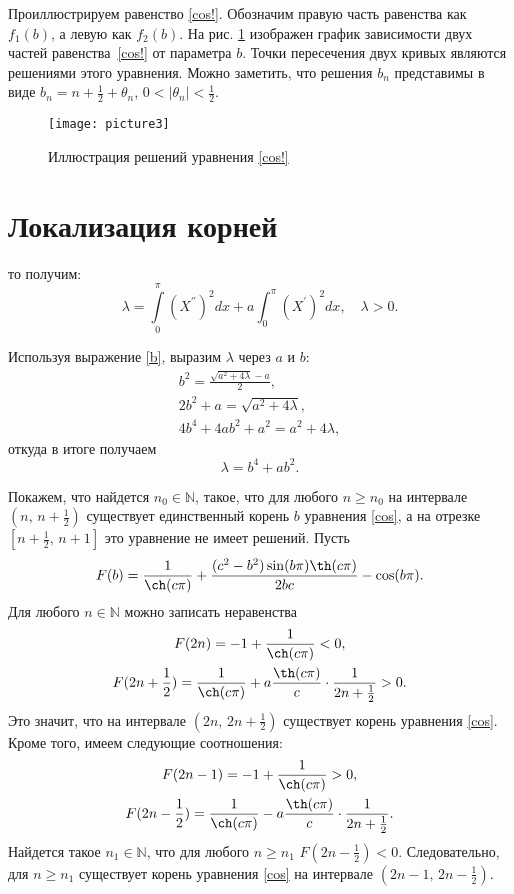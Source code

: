 \documentclass[12pt, a4paper]{article}
\begin{document}
Проиллюстрируем равенство \eqref{cos!}. Обозначим правую часть равенства как $f_1(b)$, а левую как $f_2(b)$. На рис. \ref{fig1} изображен график зависимости двух частей равенства~\eqref{cos!} от параметра $b$. Точки пересечения двух кривых являются решениями этого уравне\-ния. Можно заметить, что решения ${b_n}$ представимы в виде 
$b_n=n+\frac12+\theta_n$, $0<|\theta_n|<\frac12$.

\begin{figure}[h!]
	\begin{center}
		\texttt{[image: picture3]}
		\caption{Иллюстрация решений уравнения \eqref{cos!}}
		\label{fig1}
	\end{center}
\end{figure}

\section{Локализация корней}

 то получим:
\[
\lambda = \int\limits_0^\pi(X^{''})^2dx + a\int_0^\pi(X^{'})^2dx, \quad \lambda>0.
\]

Используя выражение \eqref{b}, выразим $\lambda$ через $a$ и $b$:
\begin{gather*}
b^2 = \frac{\sqrt{a^2+4\lambda}-a}{2}, \\
2b^2 + a = \sqrt{a^2+4\lambda}, \\
4b^4 +4ab^2 + a^2 = a^2 +4\lambda,
\end{gather*}
откуда в итоге получаем 
\begin{equation}
\lambda = b^4 + ab^2. \label{lambda}
\end{equation}

Покажем, что найдется $n_0\in \mathbb{N}$, такое, что для любого $n\ge n_0$ на интервале $(n,\,n + \frac12)$ существует единственный корень $b$ уравнения \eqref{cos}, а на отрезке $[n + \frac12,\, n+1]$ это уравнение не имеет решений.
Пусть 
\[
F(b)=\frac{1}{\ch(c\pi)} + \frac{(c^2-b^2)\sin(b\pi)\th(c\pi)}{2bc} - \cos(b\pi).
\]
Для любого $n\in \mathbb{N}$ можно записать неравенства
\begin{gather*}
F(2n)=-1+\frac{1}{\ch(c\pi)}<0,\\
F(2n+\frac12) = \frac{1}{\ch(c\pi)} + a\frac{\th(c\pi)}{c} \cdot \frac{1}{2n+\frac12}>0.
\end{gather*}
Это значит, что на интервале $(2n,\,2n + \frac12)$ существует корень уравнения \eqref{cos}. Кроме того, имеем следующие соотношения:
\begin{gather*}
F(2n-1)=-1+\frac{1}{\ch(c\pi)}>0,\\
F(2n-\frac12) = \frac{1}{\ch(c\pi)} - a\frac{\th(c\pi)}{c} \cdot \frac{1}{2n+\frac12}.
\end{gather*}
Найдется такое $n_1\in \mathbb{N}$, что для любого $n\ge n_1$ $F(2n - \frac12)<0$. Следовательно, для $n\ge n_1$ существует корень уравнения \eqref{cos} на интервале $(2n-1,\, 2n-\frac12)$.
\end{document}
